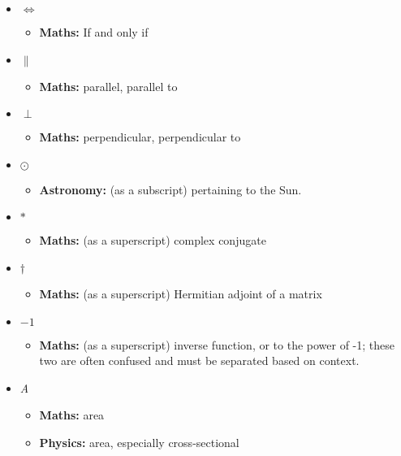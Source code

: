 	
		\begin{itemize}
			
				\item $\iff$
				\begin{itemize}
					\item\textbf{Maths:} If and only if
				\end{itemize}
			
				\item $\parallel$
				\begin{itemize}
					\item \textbf{Maths:} parallel, parallel to
				\end{itemize}
				
				\item $\perp$
				\begin{itemize}
					\item \textbf{Maths:} perpendicular, perpendicular to
				\end{itemize}
				
				\item $\odot$
				\begin{itemize}
					\item \textbf{Astronomy:} (as a subscript) pertaining to the Sun.
				\end{itemize}
				
				\item $*$
				\begin{itemize}
					\item \textbf{Maths:} (as a superscript) complex conjugate
				\end{itemize}
				
				\item $\dagger$
				\begin{itemize}
					\item \textbf{Maths:} (as a superscript) Hermitian adjoint of a matrix
				\end{itemize}
				
				\item $-1$
				\begin{itemize}
					\item \textbf{Maths:} (as a superscript) inverse function, or to the power of -1; these two are often confused and must be separated based on context.
				\end{itemize}
			
				\item \textit{A}
				\begin{itemize}
					\item\textbf{Maths:} area
					\item\textbf{Physics:} area, especially cross-sectional
				\end{itemize}
				

\end{itemize}
